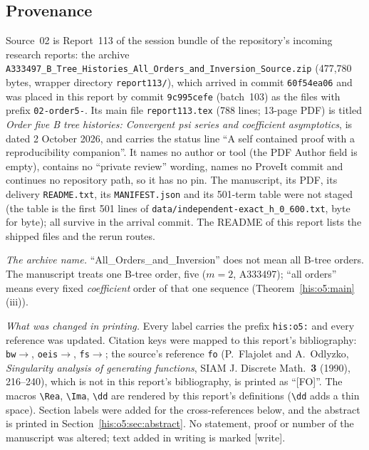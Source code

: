 \documentclass[11pt]{article}
\theoremstyle{remark}\newtheorem{remark}[theorem]{Remark}
\DeclareMathOperator{\Rea}{Re}
\DeclareMathOperator{\Ima}{Im}
\newcommand{\dd}{\,\mathrm d}
\numberwithin{equation}{section}
\begin{document}
\subsection{Provenance}\label{his:o5:sec:provenance}
{\sloppy{}\relax Source~02 is Report~113 of the session bundle of the repository's incoming research reports: the archive \texttt{A333497\_B\_Tree\_\allowbreak Histories\_\allowbreak All\_Orders\_\allowbreak and\_Inversion\_\allowbreak Source.zip} (477{,}780 bytes, wrapper directory \texttt{report113/}), which arrived in commit \texttt{60f54ea06} and was placed in this report by commit \texttt{9c995cefe} (batch~103) as the files with prefix \texttt{02-order5-}. Its main file \texttt{report113.tex} (788 lines; 13-page PDF) is titled \emph{Order five B tree histories: Convergent psi series and coefficient asymptotics}, is dated 2 October 2026, and carries the status line ``A self contained proof with a reproducibility companion''. It names no author or tool (the PDF Author field is empty), contains no ``private review'' wording, names no ProveIt commit and continues no repository path, so it has no pin. The manuscript, its PDF, its delivery \texttt{README.txt}, its \texttt{MANIFEST.json} and its 501-term table were not staged (the table is the first 501 lines of \texttt{data/independent-exact\_h\_0\_600.txt}, byte for byte); all survive in the arrival commit. The README of this report lists the shipped files and the rerun routes.\par}

\emph{The archive name.} ``All\_Orders\_and\_Inversion'' does not mean all B-tree orders. The manuscript treats one B-tree order, five ($m=2$, A333497); ``all orders'' means every fixed \emph{coefficient} order of that one sequence (Theorem~\ref{his:o5:main}(iii)).

\emph{What was changed in printing.} Every label carries the prefix \texttt{his:o5:} and every reference was updated. Citation keys were mapped to this report's bibliography: \texttt{bw}$\to$\cite{bw2026}, \texttt{oeis}$\to$\cite{oeis}, \texttt{fs}$\to$\cite{fs2009}; the source's reference \texttt{fo} (P.~Flajolet and A.~Odlyzko, \emph{Singularity analysis of generating functions}, SIAM J. Discrete Math.\ \textbf{3} (1990), 216--240), which is not in this report's bibliography, is printed as ``[FO]''. The macros \verb|\Rea|, \verb|\Ima|, \verb|\dd| are rendered by this report's definitions (\verb|\dd| adds a thin space). Section labels were added for the cross-references below, and the abstract is printed in Section~\ref{his:o5:sec:abstract}. No statement, proof or number of the manuscript was altered; text added in writing is marked \textsf{[write]}.
\end{document}
